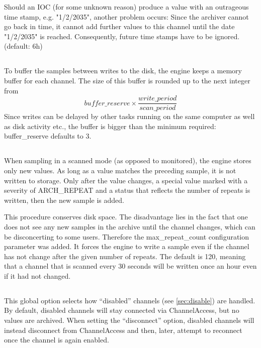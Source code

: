 Should an IOC (for some unknown reason) produce a value with an
outrageous time stamp, e.g. "1/2/2035", another problem occurs: Since
the archiver cannot go back in time, it cannot add further values to
this channel until the date "1/2/2035" is reached.  Consequently,
future time stamps have to be ignored. (default: 6h)

\subsection{} \label{sec:reserve}
To buffer the samples between writes to the disk, the engine keeps a
memory buffer for each channel. The size of this buffer is rounded up
to the next integer from
$$ buffer\_reserve \times \frac{write\_period}{scan\_period}
$$ Since writes can be delayed by other tasks running on the same
computer as well as disk activity etc., the buffer is bigger than the
minimum required: buffer\_reserve defaults to 3.

\subsection{} \label{sec:repeats}
When sampling in a scanned mode (as opposed to monitored), the engine
stores only new values. As long as a value matches the preceding
sample, it is not written to storage. Only after the value changes, a
special value marked with a severity of ARCH\_REPEAT and a status that
reflects the number of repeats is written, then the new sample is
added.

This procedure conserves disk space. The disadvantage lies in the fact
that one does not see any new samples in the archive until the
channel changes, which can be disconcerting to some users. Therefore
the max\_repeat\_count configuration parameter was added. It forces
the engine to write a sample even if the channel has not change after
the given number of repeats. The default is 120, meaning that a
channel that is scanned every 30 seconds will be written once an hour
even if it had not changed. 

\subsection{} \label{sec:disconnect}
This global option selects how ``disabled'' channels (see
\ref{sec:disable}) are handled. By default, disabled channels will
stay connected via ChannelAccess, but no values are archived.
When setting the ``disconnect'' option, disabled channels will instead
disconnect from ChannelAccess and then, later, attempt to reconnect
once the channel is again enabled.

